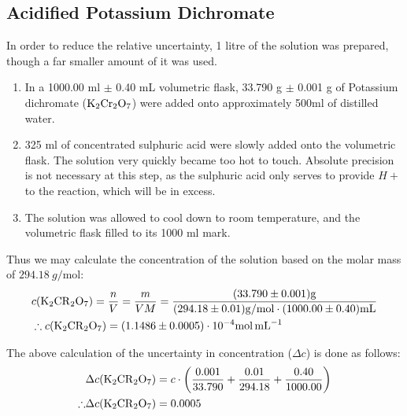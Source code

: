 \subsection{Acidified Potassium Dichromate}
In order to reduce the relative uncertainty, 1 litre of the solution was prepared, though a far smaller amount of it was used.
\begin{enumerate}
	\item In a 1000.00 ml $\pm$ 0.40 mL volumetric flask, 33.790 g $\pm$ 0.001 g of Potassium dichromate ($\ce{K2Cr2O7}$) were added onto approximately 500ml of distilled water.
	
	\item 325 ml of concentrated sulphuric acid were slowly added onto the volumetric flask. The solution very quickly became too hot to touch. Absolute precision is not necessary at this step, as the sulphuric acid only serves to provide $H+$ to the reaction, which will be in excess.
	
	\item The solution was allowed to cool down to room temperature, and the volumetric flask filled to its 1000 ml mark.
\end{enumerate}

Thus we may calculate the concentration of the solution based on the molar mass of $\SI{294.18}{g\per\mole}$:
\begin{equation}\begin{split}
&c(\ce{K2CR2O7}) = \frac{n}{V} = \frac{m}{VM} =
\frac{ (33.790\pm 0.001)\si{g}}{ (294.18 \pm 0.01)\si{g\per\mol} \cdot (1000.00 \pm 0.40)\si{\milli\litre}} \\
&\therefore c(\ce{K2CR2O7}) = (1.1486 \pm 0.0005 )\cdot 10^{-4} \si{\mol\per\milli\litre}
\end{split}
\end{equation}

The above calculation of the uncertainty in concentration ($\Delta c$) is done as follows:
\begin{equation*}
\begin{split}
	& \Delta c(\ce{K2CR2O7}) = c \cdot \left ( \frac{0.001}{33.790} + \frac{0.01}{294.18} + \frac{0.40}{1000.00} \right ) \\
	\therefore & \Delta c(\ce{K2CR2O7}) = 0.0005
\end{split}
\end{equation*} 

